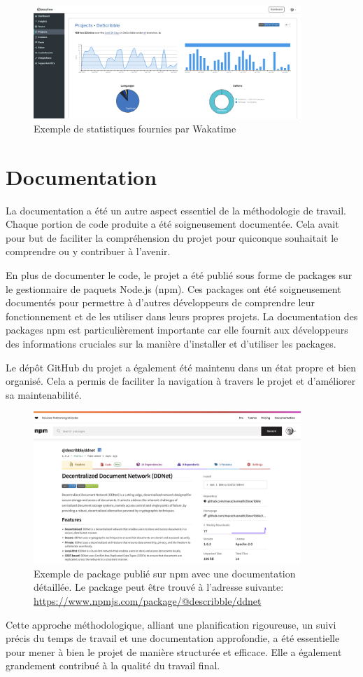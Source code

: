 \begin{figure}[H]
    \centering
    \includegraphics[width=0.9\textwidth]{assets/figures/wakatime.png}
    \caption{Exemple de statistiques fournies par Wakatime}
\end{figure}

\section{Documentation}

La documentation a été un autre aspect essentiel de la méthodologie de travail. Chaque portion de code produite a été soigneusement documentée. Cela avait pour but de faciliter la compréhension du projet pour quiconque souhaitait le comprendre ou y contribuer à l'avenir.

En plus de documenter le code, le projet a été publié sous forme de packages sur le gestionnaire de paquets Node.js (npm). Ces packages ont été soigneusement documentés pour permettre à d'autres développeurs de comprendre leur fonctionnement et de les utiliser dans leurs propres projets. La documentation des packages npm est particulièrement importante car elle fournit aux développeurs des informations cruciales sur la manière d'installer et d'utiliser les packages.

Le dépôt GitHub du projet a également été maintenu dans un état propre et bien organisé. Cela a permis de faciliter la navigation à travers le projet et d'améliorer sa maintenabilité.

\begin{figure}[H]
    \centering
    \includegraphics[width=0.9\textwidth]{assets/figures/npm-package.png}
    \caption{Exemple de package publié sur npm avec une documentation détaillée. Le package peut être trouvé à l'adresse suivante: \url{https://www.npmjs.com/package/@describble/ddnet}}
\end{figure}

Cette approche méthodologique, alliant une planification rigoureuse, un suivi précis du temps de travail et une documentation approfondie, a été essentielle pour mener à bien le projet de manière structurée et efficace. Elle a également grandement contribué à la qualité du travail final.